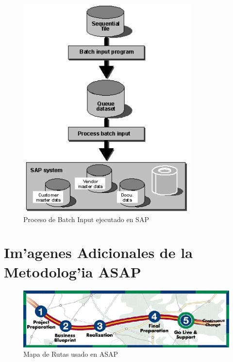 \begin{figure}[H]
\centering
\includegraphics[scale=1.0,type=jpg,ext=.jpg,read=.jpg]{figures/batch_input_process}
\caption{Proceso de Batch Input ejecutado en SAP}
\label{fig:process}
\end{figure}

\section{Im'agenes Adicionales de la Metodolog'ia ASAP}
\begin{figure}[htb]
\centering
\includegraphics[scale=0.65,type=jpg,ext=.jpg,read=.jpg]{figures/roadmap}
\caption{Mapa de Rutas usado en ASAP}
\label{fig:roadmap}
\end{figure}